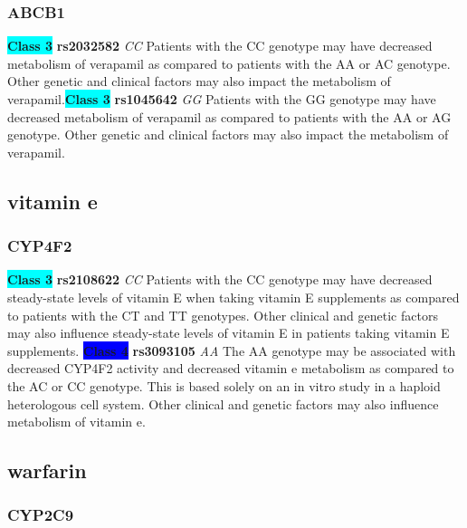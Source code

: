 \documentclass{book}
\begin{document}
\subsubsection{ ABCB1 }

\begin{center}
\textbf{\colorbox{cyan} {Class 3}} \textbf{ rs2032582 } \textit{ CC }
Patients with the CC genotype may have decreased metabolism of verapamil as compared to patients with the AA or AC genotype. Other genetic and clinical factors may also impact the metabolism of verapamil.\textbf{\colorbox{cyan} {Class 3}} \textbf{ rs1045642 } \textit{ GG }
Patients with the GG genotype may have decreased metabolism of verapamil as compared to patients with the AA or AG genotype. Other genetic and clinical factors may also impact the metabolism of verapamil.


\end{center}\subsection{ vitamin e }


\subsubsection{ CYP4F2 }

\begin{center}
\textbf{\colorbox{cyan} {Class 3}} \textbf{ rs2108622 } \textit{ CC }
Patients with the CC genotype may have decreased steady-state levels of vitamin E when taking vitamin E supplements as compared to patients with the CT and TT genotypes. Other clinical and genetic factors may also influence steady-state levels of vitamin E in patients taking vitamin E supplements.
\textbf{\colorbox{blue} {Class 4}} \textbf{ rs3093105 } \textit{ AA }
The AA genotype may be associated with decreased CYP4F2 activity and decreased vitamin e metabolism as compared to the AC or CC genotype. This is based solely on an in vitro study in a haploid heterologous cell system. Other clinical and genetic factors may also influence metabolism of vitamin e.

\end{center}\subsection{ warfarin }


\subsubsection{ CYP2C9 }
\end{document}

